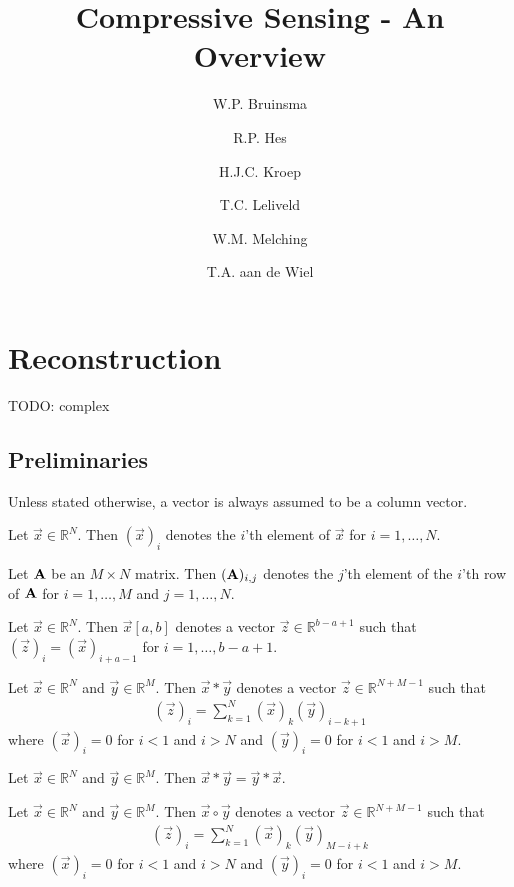 \documentclass[a4paper, openany, oneside]{memoir}
\title{Compressive Sensing - An Overview}
\author{W.P. Bruinsma \and R.P. Hes \and H.J.C. Kroep \and T.C. Leliveld \and W.M. Melching \and T.A. aan de Wiel}
\begin{document}
\chapter{Reconstruction}

TODO: complex

\section{Preliminaries}
Unless stated otherwise, a vector is always assumed to be a column vector.

\begin{blockDefinition}
    Let $\vec{x} \in \mathbb{R}^N$. Then $(\vec{x})_i$ denotes the $i$'th element of $\vec{x}$ for $i = 1,\ldots,N$.
\end{blockDefinition}

\begin{blockDefinition}
    Let $\boldsymbol{\mathbf{A}}$ be an $M \times N$ matrix. Then $(\boldsymbol{\mathbf{A}})_{i,j}$ denotes the $j$'th element of the $i$'th row of $\boldsymbol{\mathbf{A}}$ for $i = 1,\ldots,M$ and $j=1,\ldots,N$.
\end{blockDefinition}

\begin{blockDefinition}[Subvector]
    Let $\vec{x} \in \mathbb{R}^N$. Then $\vec{x}[a,b]$ denotes a vector $\vec{z} \in \mathbb{R}^{b-a+1}$ such that $(\vec{z})_i = (\vec{x})_{i+a-1}$ for $i = 1,\ldots,b-a+1$.
\end{blockDefinition}

\begin{blockDefinition}[Convolution]
    Let $\vec{x} \in \mathbb{R}^N$ and $\vec{y} \in \mathbb{R}^M$. Then $\vec{x} \ast \vec{y}$ denotes a vector $\vec{z} \in \mathbb{R}^{N+M-1}$ such that
    \begin{align*}
        (\vec{z})_i = \sum_{k=1}^{N} (\vec{x})_k (\vec{y})_{i-k+1}
    \end{align*}
    where $(\vec{x})_i=0$ for $i < 1$ and $i > N$ and $(\vec{y})_i=0$ for $i < 1$ and $i > M$.
\end{blockDefinition}

\begin{blockTheorem} \label{th:conv-comm}
    Let $\vec{x} \in \mathbb{R}^N$ and $\vec{y} \in \mathbb{R}^M$. Then $\vec{x} \ast \vec{y} = \vec{y} \ast \vec{x}$.
\end{blockTheorem}

\begin{blockDefinition}
    Let $\vec{x} \in \mathbb{R}^N$ and $\vec{y} \in \mathbb{R}^M$. Then $\vec{x} \circ \vec{y}$ denotes a vector $\vec{z} \in \mathbb{R}^{N+M-1}$ such that
    \begin{align*}
        (\vec{z})_i = \sum_{k=1}^{N} (\vec{x})_k (\vec{y})_{M-i+k}
    \end{align*}
    where $(\vec{x})_i=0$ for $i < 1$ and $i > N$ and $(\vec{y})_i=0$ for $i < 1$ and $i > M$.
\end{blockDefinition}
\end{document}
